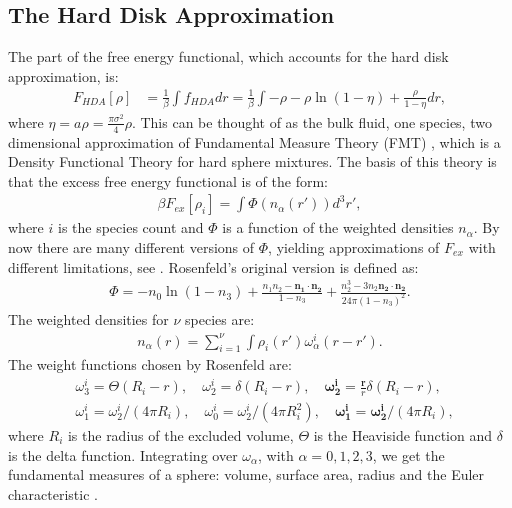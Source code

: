 \documentclass[11pt, a4paper]{article}
\theoremstyle{definition}
\begin{document}
\subsection{The Hard Disk Approximation}
The part of the free energy functional, which accounts for the hard disk approximation, is:
\begin{align*}
	F_{HDA}[\rho] &= \frac{1}{\beta} \int  f_{HDA} dr = \frac{1}{\beta} \int   -  \rho - \rho \ln(1 - \eta) + \frac{\rho}{1 - \eta} dr,
\end{align*}
where $\eta = a \rho = \frac{\pi \sigma^2}{4} \rho$.
This can be thought of as the bulk fluid, one species, two dimensional approximation of Fundamental Measure Theory (FMT)  \cite{RosenfeldFMT}, which is a Density Functional Theory for hard sphere mixtures. The basis of this theory is that the excess free energy functional is of the form:
\begin{align*}
	\beta F_{ex}[{\rho_i}] = \int \Phi({n_\alpha(r')})d^3r',
\end{align*} 
where $i$ is the species count and $\Phi$ is a function of the weighted densities $n_\alpha$. By now there are many different versions of $\Phi$, yielding approximations of $F_{ex}$ with different limitations, see \cite{Roth_2010FMTReview}. Rosenfeld's original version is defined as:
	\begin{align*}
	\Phi = -n_0 \ln(1-n_3) + \frac{n_1 n_2 - \mathbf{n_1} \cdot \mathbf{n_2}}{1-n_3} + \frac{n_2^3 - 3n_2 \mathbf{n_2} \cdot \mathbf{n_2}}{24 \pi (1-n_3)^2}.
	\end{align*}
The weighted densities for $\nu$ species are:
	\begin{align} \label{eqn:WeightedDensities}
		n_\alpha (r) = \sum_{i=1}^\nu \int \rho_i(r') \omega_\alpha^i(r -r').
	\end{align}
The weight functions chosen by Rosenfeld are:
\begin{align*}
	&\omega_3^i = \Theta(R_i -r),\quad \omega_2^i = \delta(R_i -r),\quad \mathbf{\omega_2^i} = \frac{\mathbf r}{r}\delta (R_i -r),\quad \\
	&\omega_1^i = \omega_2^i/(4 \pi R_i), \quad \omega_0^i = \omega_2^i/(4\pi R_i^2), \quad \mathbf{\omega_1^i} = \mathbf{\omega_2^i}/(4 \pi R_i),
\end{align*}
where $R_i$ is the radius of the excluded volume, $\Theta$ is the Heaviside function and $\delta$ is the delta function. Integrating over $\omega_\alpha$, with $\alpha = 0,1,2,3$, we get the fundamental measures of a sphere: volume, surface area, radius and the Euler characteristic \cite{Roth_2010FMTReview} \cite{RosenfeldFMT}.
\end{document}
